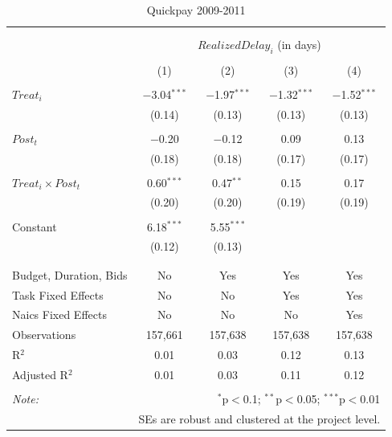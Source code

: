 \documentclass[
]{article}
\begin{document}
\begin{table}[H] \centering 
  \caption{Quickpay 2009-2011} 
  \label{} 
\small 
\begin{tabular}{@{\extracolsep{-2pt}}lcccc} 
\\[-1.8ex]\hline 
\hline \\[-1.8ex] 
\\[-1.8ex] & \multicolumn{4}{c}{$RealizedDelay_{i}$ (in days)} \\ 
\\[-1.8ex] & (1) & (2) & (3) & (4)\\ 
\hline \\[-1.8ex] 
 $Treat_i$ & $-$3.04$^{***}$ & $-$1.97$^{***}$ & $-$1.32$^{***}$ & $-$1.52$^{***}$ \\ 
  & (0.14) & (0.13) & (0.13) & (0.13) \\ 
  & & & & \\ 
 $Post_t$ & $-$0.20 & $-$0.12 & 0.09 & 0.13 \\ 
  & (0.18) & (0.18) & (0.17) & (0.17) \\ 
  & & & & \\ 
 $Treat_i \times Post_t$ & 0.60$^{***}$ & 0.47$^{**}$ & 0.15 & 0.17 \\ 
  & (0.20) & (0.20) & (0.19) & (0.19) \\ 
  & & & & \\ 
 Constant & 6.18$^{***}$ & 5.55$^{***}$ &  &  \\ 
  & (0.12) & (0.13) &  &  \\ 
  & & & & \\ 
\hline \\[-1.8ex] 
Budget, Duration, Bids & No & Yes & Yes & Yes \\ 
Task Fixed Effects & No & No & Yes & Yes \\ 
Naics Fixed Effects & No & No & No & Yes \\ 
Observations & 157,661 & 157,638 & 157,638 & 157,638 \\ 
R$^{2}$ & 0.01 & 0.03 & 0.12 & 0.13 \\ 
Adjusted R$^{2}$ & 0.01 & 0.03 & 0.11 & 0.12 \\ 
\hline 
\hline \\[-1.8ex] 
\textit{Note:}  & \multicolumn{4}{r}{$^{*}$p$<$0.1; $^{**}$p$<$0.05; $^{***}$p$<$0.01} \\ 
 & \multicolumn{4}{r}{SEs are robust and clustered at the project level.} \\ 
\end{tabular} 
\end{table}
\end{document}
